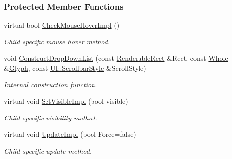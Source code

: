 \subsubsection*{Protected Member Functions}
\begin{DoxyCompactItemize}
\item 
\hypertarget{classMezzanine_1_1UI_1_1DropDownList_a4b11111a24d568251b37abef256ecce9}{
virtual bool \hyperlink{classMezzanine_1_1UI_1_1DropDownList_a4b11111a24d568251b37abef256ecce9}{CheckMouseHoverImpl} ()}
\label{classMezzanine_1_1UI_1_1DropDownList_a4b11111a24d568251b37abef256ecce9}

\begin{DoxyCompactList}\small\item\em Child specific mouse hover method. \item\end{DoxyCompactList}\item 
\hypertarget{classMezzanine_1_1UI_1_1DropDownList_a7ff7ebd9f7779e72dcba7c84870fc074}{
void \hyperlink{classMezzanine_1_1UI_1_1DropDownList_a7ff7ebd9f7779e72dcba7c84870fc074}{ConstructDropDownList} (const \hyperlink{structMezzanine_1_1UI_1_1RenderableRect}{RenderableRect} \&Rect, const \hyperlink{namespaceMezzanine_adcbb6ce6d1eb4379d109e51171e2e493}{Whole} \&\hyperlink{classMezzanine_1_1UI_1_1Glyph}{Glyph}, const \hyperlink{namespaceMezzanine_1_1UI_a5998a9bf372a7e92605c0c461736e763}{UI::ScrollbarStyle} \&ScrollStyle)}
\label{classMezzanine_1_1UI_1_1DropDownList_a7ff7ebd9f7779e72dcba7c84870fc074}

\begin{DoxyCompactList}\small\item\em Internal construction function. \item\end{DoxyCompactList}\item 
\hypertarget{classMezzanine_1_1UI_1_1DropDownList_a4987ac1e1b057ce320653ba01b70c468}{
virtual void \hyperlink{classMezzanine_1_1UI_1_1DropDownList_a4987ac1e1b057ce320653ba01b70c468}{SetVisibleImpl} (bool visible)}
\label{classMezzanine_1_1UI_1_1DropDownList_a4987ac1e1b057ce320653ba01b70c468}

\begin{DoxyCompactList}\small\item\em Child specific visibility method. \item\end{DoxyCompactList}\item 
\hypertarget{classMezzanine_1_1UI_1_1DropDownList_a85dbc074287079d020b89b7544f7967b}{
virtual void \hyperlink{classMezzanine_1_1UI_1_1DropDownList_a85dbc074287079d020b89b7544f7967b}{UpdateImpl} (bool Force=false)}
\label{classMezzanine_1_1UI_1_1DropDownList_a85dbc074287079d020b89b7544f7967b}

\begin{DoxyCompactList}\small\item\em Child specific update method. \item\end{DoxyCompactList}\end{DoxyCompactItemize}
